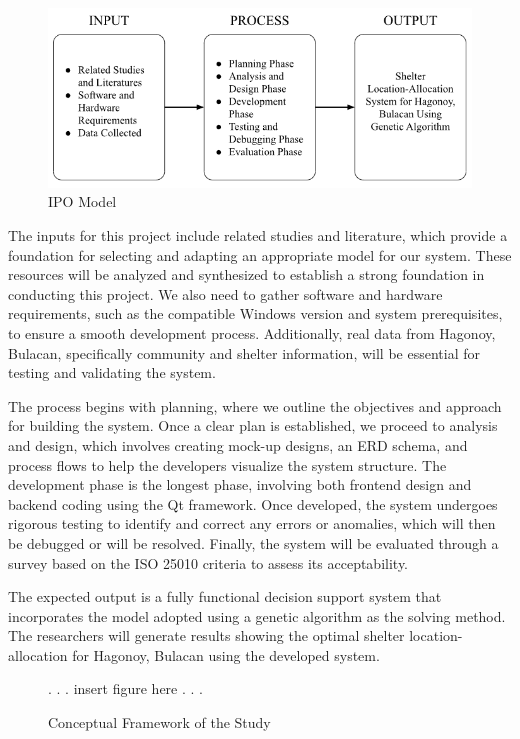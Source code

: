 	 \begin{figure}[h!]
		\centering
		\caption{IPO Model} \label{fig:ipo}
		\includegraphics[width=\linewidth]{IPO}
	\end{figure}
	
	The inputs for this project include related studies and literature, which provide a foundation for selecting and adapting an appropriate model for our system. These resources will be analyzed and synthesized to establish a strong foundation in conducting this project. We also need to gather software and hardware requirements, such as the compatible Windows version and system prerequisites, to ensure a smooth development process. Additionally, real data from Hagonoy, Bulacan, specifically community and shelter information, will be essential for testing and validating the system.
	
	The process begins with planning, where we outline the objectives and approach for building the system. Once a clear plan is established, we proceed to analysis and design, which involves creating mock-up designs, an ERD schema, and process flows to help the developers visualize the system structure. The development phase is the longest phase, involving both frontend design and backend coding using the Qt framework. Once developed, the system undergoes rigorous testing to identify and correct any errors or anomalies, which will then be debugged or will be resolved. Finally, the system will be evaluated through a survey based on the ISO 25010 criteria to assess its acceptability.
	
	The expected output is a fully functional decision support system that incorporates the  model adopted using a genetic algorithm as the solving method. The researchers will generate results showing the optimal shelter location-allocation for Hagonoy, Bulacan using the developed system.
	
	

\begin{figure}[h]
	\centering
	\caption{Conceptual Framework of the Study}
	\label{fig:IPO}
	 . . . insert figure here . . . 	
\end{figure}


